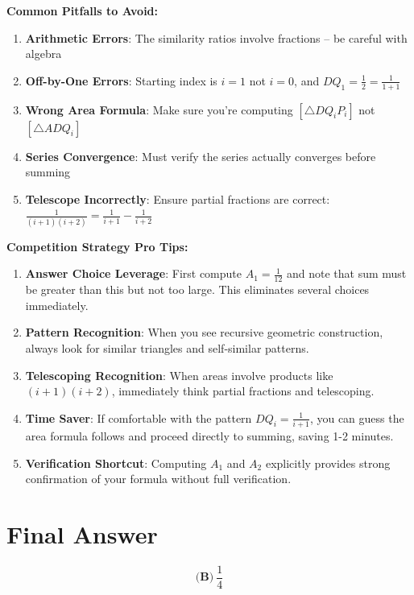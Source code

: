 \documentclass[]{article}
\begin{document}
\begin{warningbox}
\textbf{Common Pitfalls to Avoid:}
\begin{enumerate}
    \item \textbf{Arithmetic Errors}: The similarity ratios involve fractions -- be careful with algebra
    \item \textbf{Off-by-One Errors}: Starting index is $i=1$ not $i=0$, and $DQ_1 = \frac{1}{2} = \frac{1}{1+1}$
    \item \textbf{Wrong Area Formula}: Make sure you're computing $[\triangle DQ_iP_i]$ not $[\triangle ADQ_i]$
    \item \textbf{Series Convergence}: Must verify the series actually converges before summing
    \item \textbf{Telescope Incorrectly}: Ensure partial fractions are correct: $\frac{1}{(i+1)(i+2)} = \frac{1}{i+1} - \frac{1}{i+2}$
\end{enumerate}
\end{warningbox}

\begin{tipbox}
\textbf{Competition Strategy Pro Tips:}
\begin{enumerate}
    \item \textbf{Answer Choice Leverage}: First compute $A_1 = \frac{1}{12}$ and note that sum must be greater than this but not too large. This eliminates several choices immediately.
    
    \item \textbf{Pattern Recognition}: When you see recursive geometric construction, always look for similar triangles and self-similar patterns.
    
    \item \textbf{Telescoping Recognition}: When areas involve products like $(i+1)(i+2)$, immediately think partial fractions and telescoping.
    
    \item \textbf{Time Saver}: If comfortable with the pattern $DQ_i = \frac{1}{i+1}$, you can guess the area formula follows and proceed directly to summing, saving 1-2 minutes.
    
    \item \textbf{Verification Shortcut}: Computing $A_1$ and $A_2$ explicitly provides strong confirmation of your formula without full verification.
\end{enumerate}
\end{tipbox}

\section*{Final Answer}
\[\boxed{\textbf{(B)}\ \frac{1}{4}}\]
\end{document}
